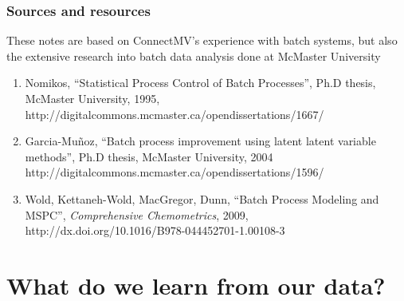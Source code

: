 
\begin{frame}\frametitle{Sources and resources}

These notes are based on ConnectMV's experience with batch systems, but also the extensive research into batch data analysis done at McMaster University

\begin{enumerate}

	\item	Nomikos, ``Statistical Process Control of Batch Processes'', Ph.D thesis, McMaster University, 1995, {\scriptsize http://digitalcommons.mcmaster.ca/opendissertations/1667/}
	
	\item	Garcia-Mu\~noz, ``Batch process improvement using latent latent variable methods'', Ph.D thesis, McMaster University, 2004 {\scriptsize http://digitalcommons.mcmaster.ca/opendissertations/1596/}
	
	\item	Wold, Kettaneh-Wold, MacGregor, Dunn, ``Batch Process Modeling and MSPC'', \emph{Comprehensive Chemometrics}, 2009, {\scriptsize http://dx.doi.org/10.1016/B978-044452701-1.00108-3}
\end{enumerate}
\end{frame}

\section{What do we learn from our data?}

